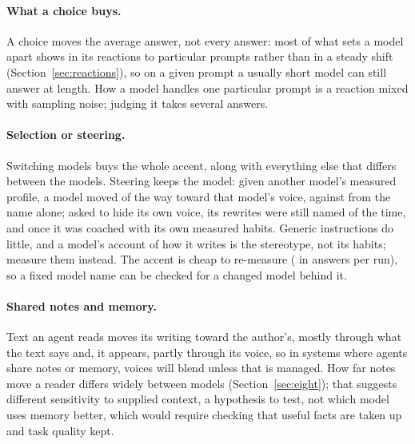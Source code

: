 \documentclass[11pt]{article}
\begin{document}
\begin{table}[t]
\centering\small
\caption{Candidates for a stated writing preference, run \texttt{oct-23-26}, on habits steady across categories ($W$) and between runs (Spearman, \texttt{oct-14-26} to \texttt{oct-23-26}). Each row gives the model at that end of the panel and the one at the other end.}
\label{tab:recommend}
\resizebox{\linewidth}{!}{}
\end{table}

\paragraph{What a choice buys.}
A choice moves the average answer, not every answer: most of what sets a model apart shows in its reactions to particular prompts rather than in a steady shift (Section~\ref{sec:reactions}), so on a given prompt a usually short model can still answer at length.
How a model handles one particular prompt is a reaction mixed with sampling noise; judging it takes several answers.

\paragraph{Selection or steering.}
Switching models buys the whole accent, along with everything else that differs between the models.
Steering keeps the model: given another model's measured profile, a model moved \imProfile{} of the way toward that model's voice, against \imName{} from the name alone; asked to hide its own voice, its rewrites were still named \hideUncoached{} of the time, and \hideCoached{} once it was coached with its own measured habits.
Generic instructions do little, and a model's account of how it writes is the stereotype, not its habits; measure them instead.
The accent is cheap to re-measure (\costRun{} in answers per run), so a fixed model name can be checked for a changed model behind it.

\paragraph{Shared notes and memory.}
Text an agent reads moves its writing toward the author's, mostly through what the text says and, it appears, partly through its voice, so in systems where agents share notes or memory, voices will blend unless that is managed.
How far notes move a reader differs widely between models (Section~\ref{sec:eight}); that suggests different sensitivity to supplied context, a hypothesis to test, not which model uses memory better, which would require checking that useful facts are taken up and task quality kept.
\end{document}
